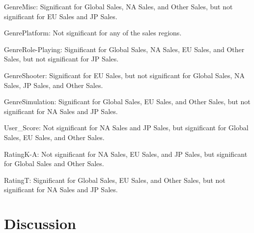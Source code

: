 \documentclass[12pt]{article}
\begin{document}
GenreMisc: Significant for Global Sales, NA Sales, and Other Sales, but not significant for EU Sales and JP Sales.

GenrePlatform: Not significant for any of the sales regions.

GenreRole-Playing: Significant for Global Sales, NA Sales, EU Sales, and Other Sales, but not significant for JP Sales.

GenreShooter: Significant for EU Sales, but not significant for Global Sales, NA Sales, JP Sales, and Other Sales.

GenreSimulation: Significant for Global Sales, EU Sales, and Other Sales, but not significant for NA Sales and JP Sales.

User_Score: Not significant for NA Sales and JP Sales, but significant for Global Sales, EU Sales, and Other Sales.

RatingK-A: Not significant for NA Sales, EU Sales, and JP Sales, but significant for Global Sales and Other Sales.

RatingT: Significant for Global Sales, EU Sales, and Other Sales, but not significant for NA Sales and JP Sales.


\section{Discussion}
\label{sec:disc}
\end{document}
